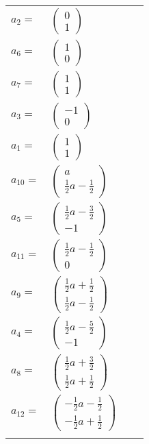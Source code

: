 \documentclass[1p]{elsarticle_modified}
\theoremstyle{definition}
\begin{document}
\begin{tabular}{m{7pt} m{180pt} m{7pt} m{180pt} }
\flushright $a_{2}=$&$\begin{pmatrix}0\\1\end{pmatrix}$ \\
\flushright $a_{6}=$&$\begin{pmatrix}1\\0\end{pmatrix}$ \\
\flushright $a_{7}=$&$\begin{pmatrix}1\\1\end{pmatrix}$ \\
\flushright $a_{3}=$&$\begin{pmatrix}-1\\0\end{pmatrix}$ \\
\flushright $a_{1}=$&$\begin{pmatrix}1\\1\end{pmatrix}$ \\
\flushright $a_{10}=$&$\begin{pmatrix}a\\\frac{1}{2} a-\frac{1}{2}\end{pmatrix}$ \\
\flushright $a_{5}=$&$\begin{pmatrix}\frac{1}{2} a-\frac{3}{2}\\-1\end{pmatrix}$ \\
\flushright $a_{11}=$&$\begin{pmatrix}\frac{1}{2} a-\frac{1}{2}\\0\end{pmatrix}$ \\
\flushright $a_{9}=$&$\begin{pmatrix}\frac{1}{2} a+\frac{1}{2}\\\frac{1}{2} a-\frac{1}{2}\end{pmatrix}$ \\
\flushright $a_{4}=$&$\begin{pmatrix}\frac{1}{2} a-\frac{5}{2}\\-1\end{pmatrix}$ \\
\flushright $a_{8}=$&$\begin{pmatrix}\frac{1}{2} a+\frac{3}{2}\\\frac{1}{2} a+\frac{1}{2}\end{pmatrix}$ \\
\flushright $a_{12}=$&$\begin{pmatrix}-\frac{1}{2} a-\frac{1}{2}\\-\frac{1}{2} a+\frac{1}{2}\end{pmatrix}$\\&\end{tabular}
\end{document}
